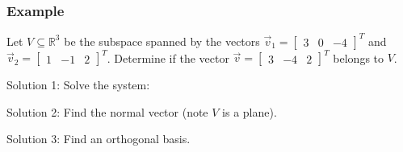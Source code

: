 \documentclass[11pt,t]{beamer}
\newcommand{\R}{\mathbb{R}}
\begin{document}
\begin{frame}\frametitle{Example}
 Let $V\subseteq \R^3$ be the subspace spanned by the vectors $\vec{v}_1 = \begin{bmatrix}3&0&-4\end{bmatrix}^T$ and $\vec{v}_2 = \begin{bmatrix}1&-1&2\end{bmatrix}^T$. Determine if the vector $\vec{v}=\begin{bmatrix}3&-4&2\end{bmatrix}^T$ belongs to $V$.

\bigskip

 \alert{Solution 1}: Solve the system:

\bigskip

\bigskip

 \alert{Solution 2}: Find the normal vector (note $V$ is a plane).

\bigskip

\bigskip

 \alert{Solution 3}: Find an orthogonal basis.
\end{frame}
\end{document}
